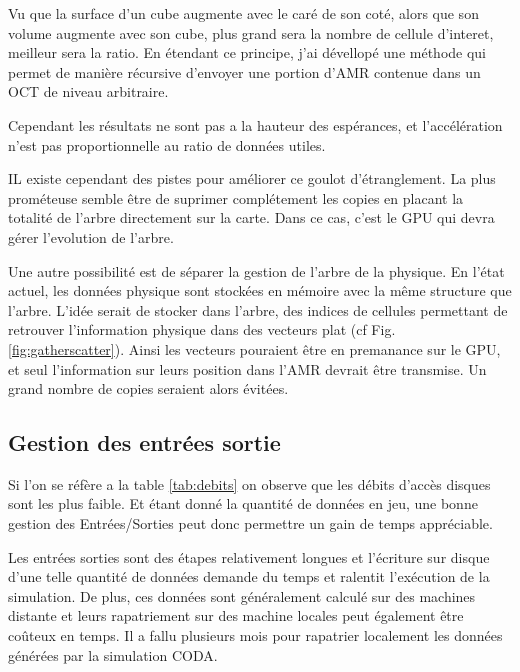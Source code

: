 Vu que la surface d'un cube augmente avec le caré de son coté, alors que son volume augmente avec son cube, plus grand sera la nombre de cellule d'interet, meilleur sera la ratio.
En étendant ce principe, j'ai dévellopé une méthode qui permet de manière récursive d'envoyer une portion d'AMR contenue dans un OCT de niveau arbitraire.

Cependant les résultats ne sont pas a la hauteur des espérances, et l'accélération n'est pas proportionnelle au ratio de données utiles.

IL existe cependant des pistes pour améliorer ce goulot d'étranglement.
La plus prométeuse semble être de suprimer complétement les copies en placant la totalité de l'arbre directement sur la carte.
Dans ce cas, c'est le GPU qui devra gérer l'evolution de l'arbre. 

Une autre possibilité est de séparer la gestion de l'arbre de la physique.
En l'état actuel, les données physique sont stockées en mémoire avec la même structure que l'arbre.
L'idée serait de stocker dans l'arbre, des indices de cellules permettant de retrouver l'information physique dans des vecteurs plat (cf Fig. \ref{fig:gatherscatter}).
Ainsi les vecteurs pouraient être en premanance sur le GPU, et seul l'information sur leurs position dans l'AMR devrait être transmise.
Un grand nombre de copies seraient alors évitées.







\subsection{Gestion des entrées sortie}

Si l'on se réfère a la table \ref{tab:debits} on observe que les débits d'accès disques sont les plus faible.
Et étant donné la quantité de données en jeu, une bonne gestion des Entrées/Sorties peut donc permettre un gain de temps appréciable.

Les entrées sorties sont des étapes relativement longues et l'écriture sur disque d'une telle quantité de données demande du temps et ralentit l'exécution de la simulation.
De plus, ces données sont généralement calculé sur des machines distante et leurs rapatriement sur des machine locales peut également être coûteux en temps.
Il a fallu plusieurs mois pour rapatrier localement les données générées par la simulation CODA.

